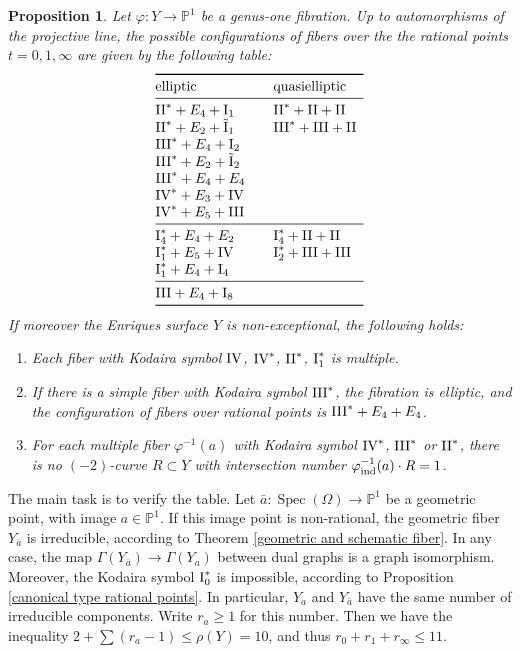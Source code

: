 \documentclass[oneside, 12pt]{amsart}
\newcommand\mylabel[1]{\label{#1}\marginpar{\vspace{-1ex}\medskip\medskip\footnotesize \tt #1}}
\renewcommand\mylabel[1]{\label{#1}}
\newtheorem{proposition}[theorem]{Proposition}
\theoremstyle{definition}
\theoremstyle{remark}
\newcommand{\PP}{\mathbb{P}}
\newcommand{\I}{\text{\rm I}}
\newcommand{\II}{\text{\rm II}}
\newcommand{\III}{\text{\rm III}}
\newcommand{\IV}{\text{\rm IV}}
\newcommand{\tI}{\text{\rm \~{I}}}
\newcommand{\ra}{\rightarrow}
\newcommand{\Spec}{\operatorname{Spec}}
\newcommand{\ind}{\text{\rm ind}}
\newcommand{\ba}{{\bar{a}}}
\newcommand{\inv}{{-1}}
\begin{document}
\begin{proposition}
\mylabel{possible configurations}
Let $\varphi:Y\ra\PP^1$ be a genus-one fibration.
Up to  automorphisms of the projective line,
the possible configurations of fibers over the the rational points $t=0,1,\infty$ are given by
the following table:
\begin{equation}
\label{first restriction}
\begin{array}[c]{@{}lll}
\toprule
\text{elliptic}		& 		& \text{quasielliptic}\\
\midrule
\II^*+E_4+\I_1		&		& \II^*+\II+\II\\
\II^*+E_2+\tI_1		&		& \III^*+\III+\II\\	 
\III^*+E_4+\I_2\\	 
\III^*+E_2+\tI_2\\
\III^*+E_4+E_4\\
\IV^*+E_3+\IV\\		 
\IV^*+E_5+\III\\
\midrule
\I_4^* +E_4+E_2		&		& \I_4^*+\II+\II\\
\I_1^*+E_5+\IV      &		& \I_2^*+\III+\III\\
\I_1^*+E_4+\I_4\\
\midrule
\III+E_4+\I_8\\
\bottomrule
\end{array}
\end{equation}
If moreover the Enriques surface $Y$ is non-exceptional, the following holds:
\begin{enumerate}
\item
Each fiber  with Kodaira symbol  $\IV$, $\IV^*$,   $\II^*$, $\I_1^*$ is multiple.
\item
If there is a simple fiber with Kodaira symbol $\III^*$, the fibration is elliptic, and the configuration
of fibers over rational points is $\III^*+E_4+E_4$.
\item
For each multiple fiber $\varphi^{-1}(a)$ with Kodaira symbol $\IV^*$, $\III^*$ or $\II^*$, there is  no $(-2)$-curve
$R\subset Y$ with intersection number  $\varphi^\inv_\ind(a)\cdot R=1$.
\end{enumerate}
\end{proposition}

\proof
The main task is to verify the table.
Let $\bar{a}:\Spec(\Omega)\ra \PP^1$ be a geometric point, with image $a\in \PP^1$.
If this image point is non-rational, the geometric fiber $Y_\ba$ is irreducible, 
according to Theorem \ref{geometric and schematic fiber}.
In any case,  the map $\Gamma(Y_\ba)\ra\Gamma(Y_a)$ between dual graphs is a graph isomorphism.
Moreover, the Kodaira symbol $\I_0^*$ is impossible, according to Proposition \ref{canonical type rational points}.
In particular, $Y_a$ and $Y_\ba$ have the same number of irreducible components. Write $r_a\geq 1$ for this number.
Then we have the inequality $2+\sum (r_a-1)\leq \rho(Y)=10$, and thus  $r_0+r_1+r_\infty\leq 11$.
\end{document}
